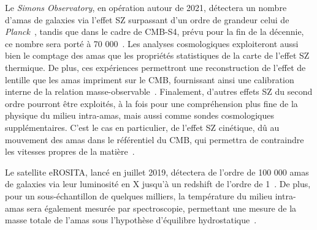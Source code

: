 Le \emph{Simons Observatory}, en opération autour de 2021, détectera
un nombre d'amas de galaxies via l'effet SZ surpassant d'un ordre de
grandeur celui de \emph{Planck}~\citep{SO2019}, tandis que dans le
cadre de CMB-S4, prévu pour la fin de la décennie, ce nombre sera
porté à 70 000~\citep{CMB-S4}. Les analyses cosmologiques exploiteront
aussi bien le comptage des amas que les propriétés statistiques de la
carte de l'effet SZ thermique. De plus, ces expériences permettront
une reconstruction de l'effet de lentille que les amas impriment sur
le CMB, fournissant ainsi une calibration interne de la relation
masse-observable~\citep{Melin2015, Louis2017}. Finalement, d'autres
effets SZ du second ordre pourront être exploités, à la fois pour une
compréhension plus fine de la physique du milieu intra-amas, mais
aussi comme sondes cosmologiques supplémentaires. C'est le cas en
particulier, de l'effet SZ cinétique, dû au mouvement des amas dans le
référentiel du CMB, qui permettra de contraindre les vitesses propres
de la matière~\citep{SO2019}.


Le satellite eROSITA, lancé en juillet 2019, détectera de l'ordre de
100 000 amas de galaxies via leur luminosité en X jusqu'à un redshift de
l'ordre de 1~\citep{eROSITA_cosmo}. De plus,
pour un sous-échantillon de quelques milliers, la température du
milieu intra-amas sera également mesurée par spectroscopie, permettant
une mesure de la masse totale de l'amas sous l'hypothèse d'équilibre
hydrostatique~\citep{Hofmann2017}. \\  


